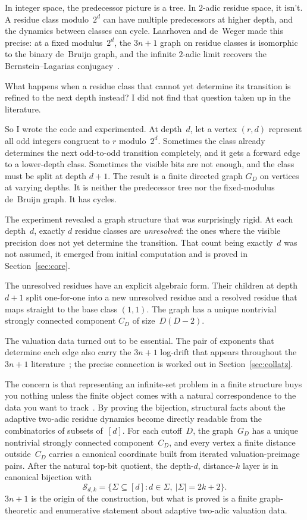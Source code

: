 \documentclass[11pt]{amsart}
\theoremstyle{definition}
\theoremstyle{remark}
\newcommand{\Sfam}{\mathcal S}
\begin{document}
In integer space, the predecessor picture is a tree.  In $2$-adic residue
space, it isn't.  A residue class modulo~$2^d$ can have multiple predecessors
at higher depth, and the dynamics between classes can cycle.  Laarhoven and
de~Weger made this precise: at a fixed modulus~$2^d$, the $3n+1$ graph on
residue classes is isomorphic to the binary de~Bruijn graph, and the infinite
$2$-adic limit recovers the Bernstein--Lagarias
conjugacy~\cite{LaarhovenDeWeger2013}.

What happens when a residue class that cannot yet determine its transition is
refined to the next depth instead?  I did not find that question taken up in
the literature.

So I wrote the code and experimented.  At depth~$d$, let a vertex $(r,d)$ represent all odd
integers congruent to $r$ modulo~$2^d$.  Sometimes the class already
determines the next odd-to-odd transition completely, and it gets a forward
edge to a lower-depth class.  Sometimes the visible bits are not enough, and
the class must be split at depth $d+1$.  The result is a finite directed graph
$G_D$ on vertices at varying depths.  It is neither the predecessor tree nor
the fixed-modulus de~Bruijn graph.  It has cycles.

The experiment revealed a graph structure that was surprisingly rigid.  At each 
depth~$d$, exactly $d$ residue classes are \emph{unresolved}: the ones where the visible 
precision does not yet determine the transition.  That count being exactly~$d$ was 
not assumed, it emerged from initial computation and is proved in Section~\ref{sec:core}.

The unresolved residues have an explicit algebraic form.  Their
children at depth $d+1$ split one-for-one into a new unresolved residue and a
resolved residue that maps straight to the base class $(1,1)$.  The graph has
a unique nontrivial strongly connected component $C_D$ of
size~$D(D-2)$.

The valuation data turned out to be essential.  The pair of exponents that
determine each edge also carry the $3n+1$ log-drift that appears throughout
the $3n+1$ literature~\cite{Terras1976, Everett1977, Eliahou1993, Tao2022};
the precise connection is worked out in Section~\ref{sec:collatz}.

The concern is that representing an infinite-set problem in a finite structure 
buys you nothing unless the finite object comes with a natural correspondence 
to the data you want to track~\cite{Stanley2012, FlajoletSedgewick2009}.  By 
proving the bijection, structural facts about the adaptive two-adic residue 
dynamics become directly readable from the combinatorics of subsets of~$[d]$.  
For each cutoff~$D$, the graph~$G_D$ has a unique nontrivial strongly connected
component~$C_D$, and every vertex a finite distance outside~$C_D$ carries a 
canonical coordinate built from iterated valuation-preimage pairs.  After the 
natural top-bit quotient, the depth-$d$, distance-$k$ layer is in canonical bijection 
with
\[
\Sfam_{d,k}=\{\Sigma\subseteq[d]:d\in\Sigma,\ |\Sigma|=2k+2\}.
\]
$3n+1$ is the origin of the construction, but what is proved is a finite
graph-theoretic and enumerative statement about adaptive two-adic valuation
data.
\end{document}
